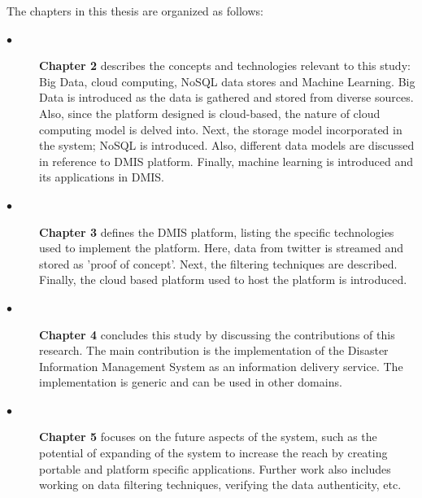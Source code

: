 The chapters in this thesis are organized as follows:

\begin{description}
	
	\item[$\bullet$ ]
	\textbf {Chapter 2} describes the concepts and technologies relevant to this study: Big Data, cloud computing, NoSQL data stores and Machine Learning. Big Data is introduced as the data is gathered and stored from diverse sources. Also, since the platform designed is cloud-based, the nature of cloud computing model is delved into. Next, the storage model incorporated in the system; NoSQL is introduced. Also, different data models are discussed in reference to DMIS platform. Finally, machine learning is introduced and its applications in DMIS.

	\item[$\bullet$ ]
	\textbf {Chapter 3} defines the DMIS platform, listing the specific technologies used to implement the platform. Here, data from twitter is streamed and stored as 'proof of concept'. Next, the filtering techniques are described. Finally, the cloud based platform used to host the platform is introduced.

	\item[$\bullet$ ]
	\textbf {Chapter 4} concludes this study by discussing the contributions of this research. The main contribution is the implementation of the Disaster Information Management System as an information delivery service. The implementation is generic and can be used in other domains.

	\item[$\bullet$ ]
	\textbf {Chapter 5} focuses on the future aspects of the system, such as the potential of expanding of the system to increase the reach by creating portable and platform specific applications. Further work also includes working on data filtering techniques, verifying the data authenticity, etc.

\end{description}

%


%
